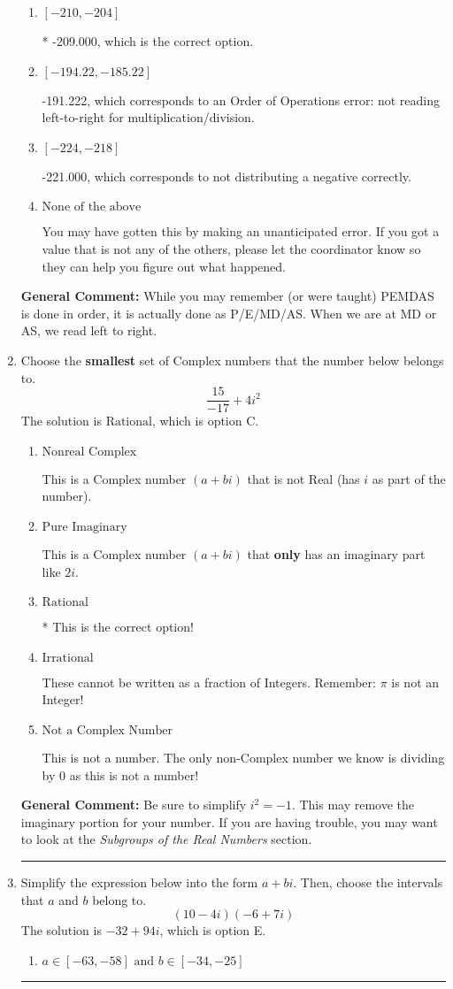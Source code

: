 \documentclass{extbook}[14pt]
\newcommand{\litem}[1]{\item #1

\rule{\textwidth}{0.4pt}}
\begin{document}
\begin{enumerate}
{\begin{enumerate}[label=\Alph*.]
 224.778, which corresponds to not distributing addition and subtraction correctly.
\item \( [-210, -204] \)

* -209.000, which is the correct option.
\item \( [-194.22, -185.22] \)

 -191.222, which corresponds to an Order of Operations error: not reading left-to-right for multiplication/division.
\item \( [-224, -218] \)

 -221.000, which corresponds to not distributing a negative correctly.
\item \( \text{None of the above} \)

 You may have gotten this by making an unanticipated error. If you got a value that is not any of the others, please let the coordinator know so they can help you figure out what happened.
\end{enumerate}

\textbf{General Comment:} While you may remember (or were taught) PEMDAS is done in order, it is actually done as P/E/MD/AS. When we are at MD or AS, we read left to right.
}
\litem{
Choose the \textbf{smallest} set of Complex numbers that the number below belongs to.
\[ \frac{15}{-17}+4i^2 \]The solution is \( \text{Rational} \), which is option C.\begin{enumerate}[label=\Alph*.]
\item \( \text{Nonreal Complex} \)

This is a Complex number $(a+bi)$ that is not Real (has $i$ as part of the number).
\item \( \text{Pure Imaginary} \)

This is a Complex number $(a+bi)$ that \textbf{only} has an imaginary part like $2i$.
\item \( \text{Rational} \)

* This is the correct option!
\item \( \text{Irrational} \)

These cannot be written as a fraction of Integers. Remember: $\pi$ is not an Integer!
\item \( \text{Not a Complex Number} \)

This is not a number. The only non-Complex number we know is dividing by 0 as this is not a number!
\end{enumerate}

\textbf{General Comment:} Be sure to simplify $i^2 = -1$. This may remove the imaginary portion for your number. If you are having trouble, you may want to look at the \textit{Subgroups of the Real Numbers} section.
}
\litem{
Simplify the expression below into the form $a+bi$. Then, choose the intervals that $a$ and $b$ belong to.
\[ (10 - 4 i)(-6 + 7 i) \]The solution is \( -32 + 94 i \), which is option E.\begin{enumerate}[label=\Alph*.]
\item \( a \in [-63, -58] \text{ and } b \in [-34, -25] \)


\end{enumerate}}
\end{enumerate}
\end{document}
